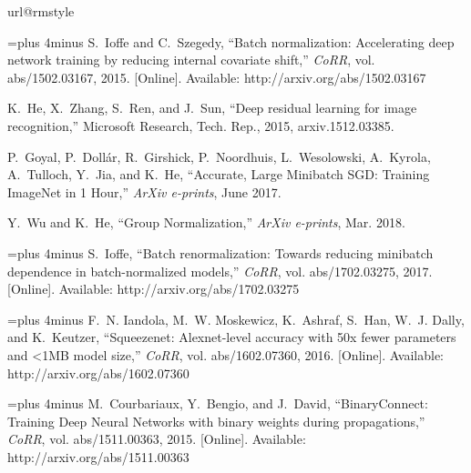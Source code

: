 \documentclass[conference]{IEEEtran}
\begin{document}
\begin{thebibliography}{10}
\providecommand{\url}[1]{#1}
\csname url@rmstyle\endcsname
\providecommand{\newblock}{\relax}
\providecommand{\bibinfo}[2]{#2}
\providecommand\BIBentrySTDinterwordspacing{\spaceskip=0pt\relax}
\providecommand\BIBentryALTinterwordstretchfactor{4}
\providecommand\BIBentryALTinterwordspacing{\spaceskip=\fontdimen2\font plus
\BIBentryALTinterwordstretchfactor\fontdimen3\font minus
  \fontdimen4\font\relax}
\providecommand\BIBforeignlanguage[2]{{\expandafter\ifx\csname l@#1\endcsname\relax
\typeout{** WARNING: IEEEtran.bst: No hyphenation pattern has been}\typeout{** loaded for the language `#1'. Using the pattern for}\typeout{** the default language instead.}\else
\language=\csname l@#1\endcsname
\fi
#2}}

\BIBentryALTinterwordspacing
S.~Ioffe and C.~Szegedy, ``Batch normalization: Accelerating deep network
  training by reducing internal covariate shift,'' \emph{CoRR}, vol.
  abs/1502.03167, 2015. [Online]. Available:
  \url{http://arxiv.org/abs/1502.03167}
\BIBentrySTDinterwordspacing

K.~He, X.~Zhang, S.~Ren, and J.~Sun, ``Deep residual learning for image
  recognition,'' Microsoft Research, Tech. Rep., 2015, arxiv.1512.03385.

P.~{Goyal}, P.~{Doll{\'a}r}, R.~{Girshick}, P.~{Noordhuis}, L.~{Wesolowski},
  A.~{Kyrola}, A.~{Tulloch}, Y.~{Jia}, and K.~{He}, ``{Accurate, Large
  Minibatch SGD: Training ImageNet in 1 Hour},'' \emph{ArXiv e-prints}, June
  2017.

Y.~{Wu} and K.~{He}, ``{Group Normalization},'' \emph{ArXiv e-prints}, Mar.
  2018.

\BIBentryALTinterwordspacing
S.~Ioffe, ``Batch renormalization: Towards reducing minibatch dependence in
  batch-normalized models,'' \emph{CoRR}, vol. abs/1702.03275, 2017. [Online].
  Available: \url{http://arxiv.org/abs/1702.03275}
\BIBentrySTDinterwordspacing

\BIBentryALTinterwordspacing
F.~N. Iandola, M.~W. Moskewicz, K.~Ashraf, S.~Han, W.~J. Dally, and K.~Keutzer,
  ``Squeezenet: Alexnet-level accuracy with 50x fewer parameters and
  {\textless}1{MB} model size,'' \emph{CoRR}, vol. abs/1602.07360, 2016.
  [Online]. Available: \url{http://arxiv.org/abs/1602.07360}
\BIBentrySTDinterwordspacing

\BIBentryALTinterwordspacing
M.~Courbariaux, Y.~Bengio, and J.~David, ``{BinaryConnect}: {Training Deep
  Neural Networks} with binary weights during propagations,'' \emph{CoRR}, vol.
  abs/1511.00363, 2015. [Online]. Available:
  \url{http://arxiv.org/abs/1511.00363}
\BIBentrySTDinterwordspacing


\end{thebibliography}
\end{document}
